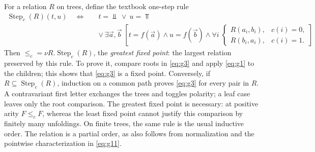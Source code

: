 For a relation $R$ on trees, define the textbook one-step rule
\begin{equation}\label{eq:g4}
\begin{split}
 \operatorname{Step}_c(R)(t,u)\quad\Longleftrightarrow\quad& t=\Bot\ \lor\ u=\Top\\
 &\lor\ \exists\vec a,\vec b\;[t=f(\vec a)\land u=f(\vec b)\land
 \forall i\;\begin{cases}R(a_i,b_i),&c(i)=0,\\R(b_i,a_i),&c(i)=1.\end{cases}]
\end{split}
\end{equation}
Then $\le_c=\nu R.\operatorname{Step}_c(R)$, the \emph{greatest fixed point}:
the largest relation preserved by this rule. To prove it, compare roots
in \eqref{eq:g3} and apply \eqref{eq:g1} to the children; this shows that
\eqref{eq:g3} is a fixed point. Conversely, if $R\subseteq\operatorname{Step}_c(R)$,
induction on a common path proves \eqref{eq:g3} for every pair in $R$.
A contravariant first letter exchanges the trees and toggles polarity; a
leaf case leaves only the root comparison. The greatest fixed point is
necessary: at positive arity $F\le_c F$, whereas the least fixed point
cannot justify this comparison by finitely many unfoldings. On finite
trees, the same rule is the usual inductive order. The relation is a partial
order, as also follows from normalization and the pointwise characterization
in \eqref{eq:g11}.

